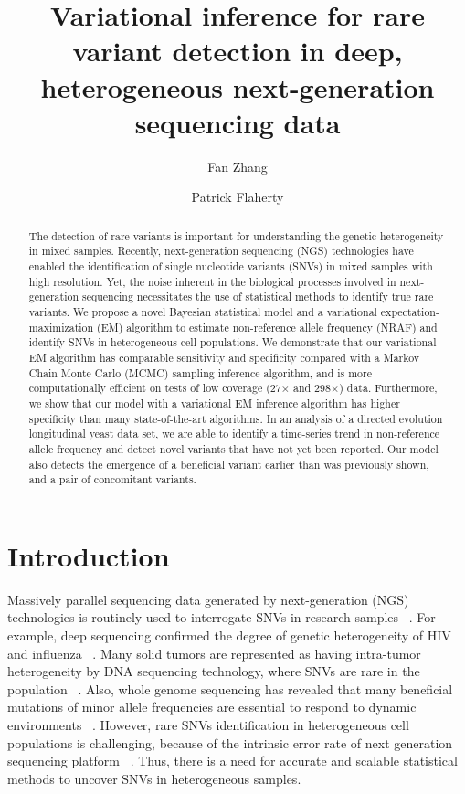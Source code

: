 \documentclass[11pt,reqno]{amsart}
\title[VI for RVD]{Variational inference for rare variant detection in deep, heterogeneous next-generation sequencing data}
\author[F. Zhang]{Fan Zhang}\address{Department of Biomedical Engineering, Worcester Polytechnic Institute}
\author[P. Flaherty]{Patrick Flaherty}\address{Department of Mathematics and Statistics, University of Massachusetts, Amherst}
\begin{document}
\maketitle

\begin{abstract}
  The detection of rare variants is important for understanding the genetic heterogeneity in mixed samples.
Recently, next-generation sequencing (NGS) technologies have enabled the identification of single nucleotide variants (SNVs) in mixed samples with high resolution.
Yet, the noise inherent in the biological processes involved in next-generation sequencing necessitates the use of statistical methods to identify true rare variants.
We propose a novel Bayesian statistical model and a variational expectation-maximization (EM) algorithm to estimate non-reference allele frequency (NRAF) and identify SNVs in heterogeneous cell populations.
We demonstrate that our variational EM algorithm has comparable sensitivity and specificity compared with a Markov Chain Monte Carlo (MCMC) sampling inference algorithm, and is more computationally efficient on tests of low coverage (27$\times$ and 298$\times$) data.
Furthermore, we show that our model with a variational EM inference algorithm has higher specificity than many state-of-the-art algorithms.
In an analysis of a directed evolution longitudinal yeast data set, we are able to identify a time-series trend in non-reference allele frequency and detect novel variants that have not yet been reported.
Our model also detects the emergence of a beneficial variant earlier than was previously shown, and a pair of concomitant variants.
\end{abstract}

\section{Introduction}
Massively parallel sequencing data generated by next-generation (NGS) technologies is routinely used to interrogate SNVs in research samples ~\citep{koboldt2013next}.
For example, deep sequencing confirmed the degree of genetic heterogeneity of HIV \citet{} and influenza ~\citep{flaherty2011ultrasensitive}.
Many solid tumors are represented as having intra-tumor heterogeneity by DNA sequencing technology, where SNVs are rare in the population ~\citep{navin2010inferring}.
Also, whole genome sequencing has revealed that many beneficial mutations of minor allele frequencies are essential to respond to dynamic environments ~\citep{kvitek2013whole}.
However, rare SNVs identification in heterogeneous cell populations is challenging, because of the intrinsic error rate of next generation sequencing platform ~\citep{shendure2008next}.
Thus, there is a need for accurate and scalable statistical methods to uncover SNVs in heterogeneous samples.
\end{document}
